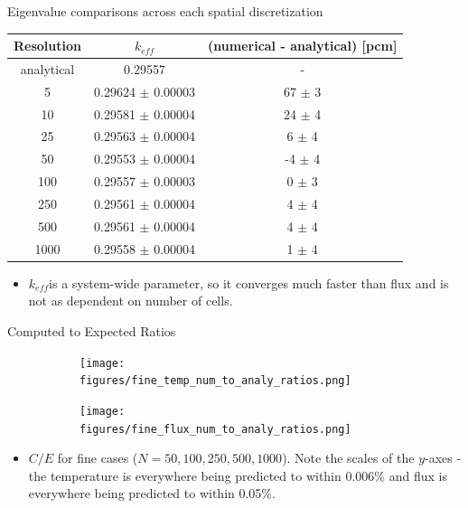 \documentclass[9pt,t]{beamer}
\newcommand{\keff}{$k_{e\!f\!f}$}
\begin{document}
\begin{frame}{Eigenvalue comparisons across each spatial discretization}
    \begin{table}[H]
        \centering
        \begin{tabular}{@{}ccc@{}}
            \toprule
            Resolution &  \keff & (numerical - analytical) [pcm]\\
            \midrule
            analytical & 0.29557 & - \\
            \midrule
            5    & 0.29624 $\pm$ 0.00003 & \phantom{-}67 $\pm$ 3 \\
            10   & 0.29581 $\pm$ 0.00004 & \phantom{-}24 $\pm$ 4 \\
            25   & 0.29563 $\pm$ 0.00004 & \phantom{-}6  $\pm$ 4 \\
            50   & 0.29553 $\pm$ 0.00004 &           -4  $\pm$ 4 \\
            100  & 0.29557 $\pm$ 0.00003 & \phantom{-}0  $\pm$ 3 \\
            250  & 0.29561 $\pm$ 0.00004 & \phantom{-}4  $\pm$ 4 \\
            500  & 0.29561 $\pm$ 0.00004 & \phantom{-}4  $\pm$ 4 \\
            1000 & 0.29558 $\pm$ 0.00004 & \phantom{-}1  $\pm$ 4 \\
        \bottomrule
        \end{tabular}
    \end{table}
    \begin{itemize}
        \item<2-> \keff is a system-wide parameter, so it converges much faster than flux and is not as dependent on number of cells.
    \end{itemize}
\end{frame}

\begin{frame}{Computed to Expected Ratios}
    \vspace*{-0.4cm}
    \pause
    \begin{figure}[T]
        \hspace*{-0.87cm}
        \begin{subfigure}{0.495\linewidth}
            \texttt{[image: figures/fine\_temp\_num\_to\_analy\_ratios.png]}
        \end{subfigure}\hspace*{0.85cm}
        \begin{subfigure}{0.495\linewidth}
            \texttt{[image: figures/fine\_flux\_num\_to\_analy\_ratios.png]}
        \end{subfigure}
    \end{figure}
    \begin{itemize}
        \item $C/E$ for fine cases ($N=50,100,250,500,1000$). Note the scales of the $y$-axes - the temperature is everywhere being predicted to within 0.006\% and flux is everywhere being predicted to within 0.05\%.
    \end{itemize}
\end{frame}
\end{document}
